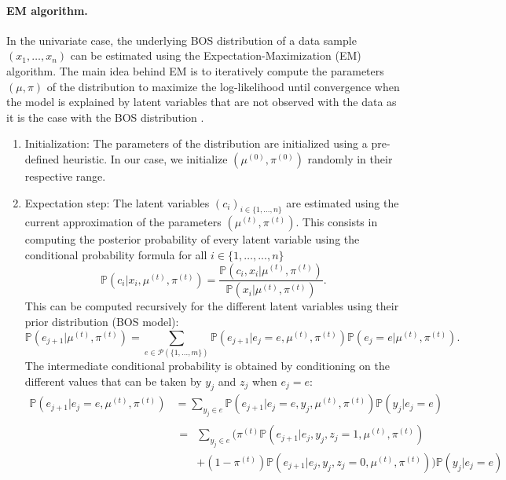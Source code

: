 \paragraph{EM algorithm.} In the univariate case, the underlying BOS distribution of a data sample $(x_1, \ldots, x_n)$ can be estimated using the Expectation-Maximization (EM) algorithm. The main idea behind EM is to iteratively compute the parameters $(\mu, \pi)$ of the distribution to maximize the log-likelihood until convergence when the model is explained by latent variables that are not observed with the data as it is the case with the BOS distribution \citep{biernacki2016model}.
\begin{enumerate}
    \item Initialization: The parameters of the distribution are initialized using a pre-defined heuristic. In our case, we initialize $(\mu^{(0)}, \pi^{(0)})$ randomly in their respective range.
    \item Expectation step: The latent variables $(c_i)_{i \in \{1, \ldots, n\}}$ are estimated using the current approximation of the parameters $(\mu^{(t)}, \pi^{(t)})$. This consists in computing the posterior probability of every latent variable using the conditional probability formula for all $i\in \{1, \ldots, ..., n\}$
    \begin{equation}
        \mathbb{P}(c_i | x_i, \mu^{(t)}, \pi^{(t)}) = \frac{\mathbb{P}(c_i, x_i| \mu^{(t)}, \pi^{(t)})}{\mathbb{P}(x_i| \mu^{(t)}, \pi^{(t)})}
    .\end{equation}
    This can be computed recursively for the different latent variables using their prior distribution (BOS model):
    \begin{equation}
        \mathbb{P}(e_{j+1}| \mu^{(t)}, \pi^{(t)}) = \sum_{e\in \mathcal{P}(\{1, \ldots, m\})} \mathbb{P}(e_{j+1}|e_j=e,  \mu^{(t)}, \pi^{(t)}) \mathbb{P}(e_j=e| \mu^{(t)}, \pi^{(t)})
    .\end{equation}
    The intermediate conditional probability is obtained by conditioning on the different values that can be taken by $y_j$ and $z_j$ when $e_j=e$:
    \begin{align}
    \mathbb{P}(e_{j+1}|e_j=e, \mu^{(t)}, \pi^{(t)}) &= \sum_{y_j \in e} \mathbb{P}(e_{j+1}|e_j=e, y_j, \mu^{(t)}, \pi^{(t)})\mathbb{P}(y_j|e_j=e) \\
    &\begin{aligned}
        = &\sum_{y_j \in e} (\pi^{(t)}\mathbb{P}(e_{j+1}|e_j, y_j, z_j=1, \mu^{(t)}, \pi^{(t)}) \\ 
        & + (1-\pi^{(t)})\mathbb{P}(e_{j+1}|e_j, y_j, z_j=0, \mu^{(t)}, \pi^{(t)}))\mathbb{P}(y_j|e_j=e)

\end{aligned}
\end{align}
\end{enumerate}
